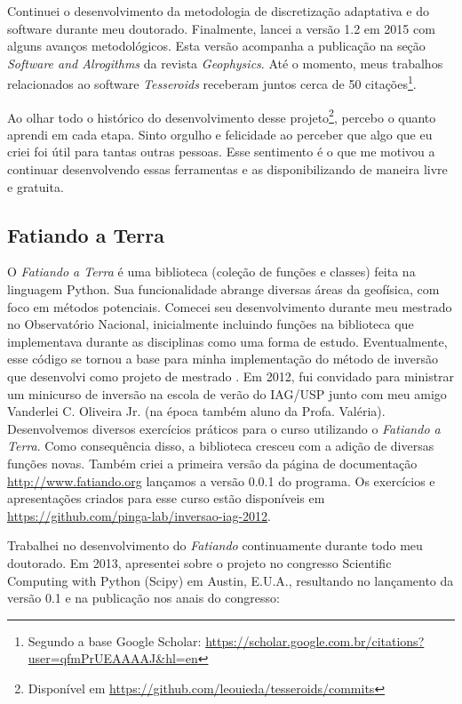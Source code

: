 Continuei o desenvolvimento da metodologia de discretização adaptativa e do
software durante meu doutorado.
Finalmente, lancei a versão 1.2 em 2015 com alguns avanços metodológicos.
Esta versão acompanha a publicação \citet{tesseroids} na seção \textit{Software
and Alrogithms} da revista \textit{Geophysics}.
Até o momento, meus trabalhos relacionados ao software \textit{Tesseroids}
receberam juntos cerca de 50 citações\footnote{Segundo a base Google Scholar:
\url{https://scholar.google.com.br/citations?user=qfmPrUEAAAAJ&hl=en}}.

Ao olhar todo o histórico do desenvolvimento desse
projeto\footnote{Disponível em
\url{https://github.com/leouieda/tesseroids/commits}},
percebo o quanto aprendi em cada etapa.
Sinto orgulho e felicidade ao perceber que algo que eu criei foi útil para
tantas outras pessoas.
Esse sentimento é o que me motivou a continuar desenvolvendo essas ferramentas
e as disponibilizando de maneira livre e gratuita.



\subsection{Fatiando a Terra}


O \textit{Fatiando a Terra} é uma biblioteca (coleção de funções e classes)
feita na linguagem Python.
Sua funcionalidade abrange diversas áreas da geofísica, com foco em métodos
potenciais.
Comecei seu desenvolvimento durante meu mestrado no Observatório Nacional,
inicialmente incluindo funções na biblioteca que implementava durante as
disciplinas como uma forma de estudo.
Eventualmente, esse código se tornou a base para minha implementação do método
de inversão que desenvolvi como projeto de mestrado \citep[][cujo código está
disponível em
\url{https://github.com/pinga-lab/paper-planting-densities}]{seed}.
Em 2012, fui convidado para ministrar um minicurso de inversão na escola de
verão do IAG/USP junto com meu
amigo Vanderlei C. Oliveira Jr. (na época também aluno da Profa.  Valéria).
Desenvolvemos diversos exercícios práticos para o curso utilizando o
\textit{Fatiando a Terra}.
Como consequência disso, a biblioteca cresceu com a adição de diversas funções
novas.
Também criei a primeira versão da página de documentação
\url{http://www.fatiando.org} lançamos a versão 0.0.1 do programa.
Os exercícios e apresentações criados para esse curso estão disponíveis em
\url{https://github.com/pinga-lab/inversao-iag-2012}.

Trabalhei no desenvolvimento do \textit{Fatiando} continuamente durante todo
meu doutorado.
Em 2013, apresentei sobre o projeto no congresso Scientific Computing with
Python (Scipy) em Austin, E.U.A., resultando no lançamento da versão 0.1 e na
publicação nos anais do congresso:

